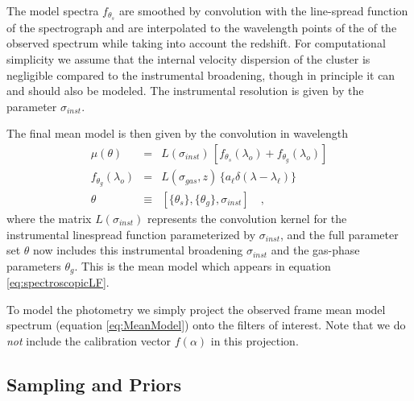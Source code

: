 \documentclass[iop,numberedappendix]{emulateapj}
\begin{document}

The model spectra $f_{\theta_s}$ are smoothed by convolution with
the line-spread function of the spectrograph and are interpolated to
the wavelength points of the of the observed spectrum while taking
into account the redshift. For computational simplicity we assume that
the internal velocity dispersion of the cluster is negligible compared
to the instrumental broadening, though in principle it can and should
also be modeled. The instrumental resolution is given by the parameter
$\sigma_{inst}$. 

The final mean model is then given by the convolution in wavelength
\begin{eqnarray}\label{eq:MeanModel} 
\mu(\theta) &  = & L(\sigma_{inst}) \, \left[ f_{\theta_s}(\lambda_o)
                   + f_{\theta_g}(\lambda_o) \right]\\
f_{\theta_g}(\lambda_o) & = & L(\sigma_{gas}, z) \,  \{a_\ell\delta(\lambda-\lambda_\ell)\}\\
\theta & \equiv & \left[ \{\theta_s\}, \{\theta_{g}\}, \sigma_{inst} \right]
\quad ,
\end{eqnarray}
where the matrix $L(\sigma_{inst})$ represents the convolution kernel
for the instrumental linespread function parameterized by
$\sigma_{inst}$,
and the full parameter set $\theta$ now includes
this instrumental broadening $\sigma_{inst}$ 
and the gas-phase parameters $\theta_g$.
This is the mean model which appears in equation
\ref{eq:spectroscopicLF}.

To model the photometry we simply project the observed frame mean
model spectrum (equation \ref{eq:MeanModel}) onto the filters of
interest.  Note that we do \emph{not} include the calibration vector
$f(\alpha)$ in this projection.


\subsection{Sampling and Priors}
\end{document}
